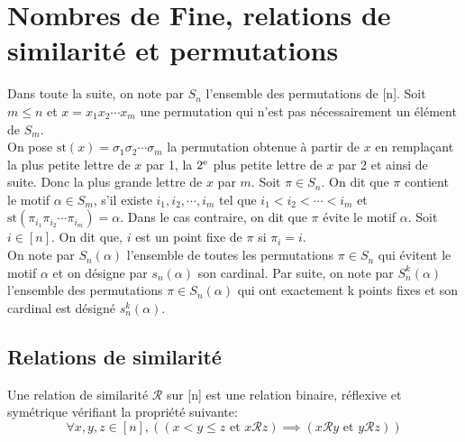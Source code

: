 \chapter{Nombres de Fine, relations de similarité et permutations}
Dans toute la suite, on note par $S_{n}$ l'ensemble des permutations de [n]. Soit $m\leq n$ et $x = x_{1}x_{2}\cdots x_{m} $ une permutation qui n'est pas nécessairement un élément de $ S_{m} $.\\ On pose $\text{st}(x) = \sigma_{1}\sigma_{2}\cdots \sigma_{m}$ la permutation obtenue à partir de $x$ en remplaçant
la plus petite lettre de $x$ par 1, la $2\textsuperscript{e}$ plus petite lettre de $x$ par 2 et ainsi
de suite. Donc la plus grande lettre de $x$ par $m$. Soit $\pi \in S_{n}$. On dit que $\pi $ contient le
motif $\alpha \in S_{m}$, s'il existe $i_{1},i_{2}, \cdots, i_{m}$ tel que $i_{1}<i_{2}< \cdots
	<i_{m}$ et $\text{st}(\pi_{i_{1}}\pi_{i_{2}}\cdots \pi_{i_{m}})=\alpha$. Dans le cas contraire, on dit que $\pi$ évite le motif $\alpha$.
Soit $i\in [n]$. On dit que, $i$ est un point fixe de $\pi$ si $\pi_{i}=i$.\\ On note par  $S_{n}(\alpha)$ l'ensemble
de toutes les permutations $\pi \in S_{n}$ qui évitent le motif $\alpha$ et on désigne par $s_{n}(\alpha)$ son cardinal. Par suite, on note par $S_{n}^k(\alpha)$ l'ensemble des permutations $\pi \in S_{n}(\alpha)$ qui ont exactement k points fixes et son cardinal est désigné $s_{n}^{k}(\alpha)$.
\vspace{5pt}


\section{Relations de similarité }
\begin{definition}
	\begin{rm}
		Une relation de similarité $\mathcal{R}$ sur [n] est une relation binaire, réflexive et symétrique
		vérifiant la propriété suivante:
		$$\forall x, y, z \in [n], \left((x<y\leq z \text{ et } x\mathcal{R}z) \implies
			(x\mathcal{R}y \text{ et } y\mathcal{R}z)\right) $$
	\end{rm}
\end{definition}

